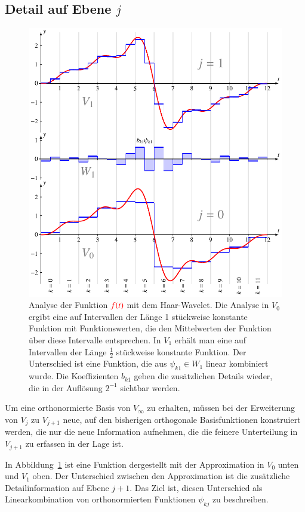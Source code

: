 \subsection{Detail auf Ebene $j$}
\begin{figure}
\centering
\includegraphics{chapters/3-haar/images/detail.pdf}
\caption{Analyse der Funktion $\color{red}f(t)$ mit dem Haar-Wavelet.
Die Analyse in $V_0$ ergibt eine auf Intervallen der Länge 1 stückweise
konstante Funktion mit Funktionswerten, die den Mittelwerten der Funktion
über diese Intervalle entsprechen.
In $V_1$ erhält man eine auf Intervallen der Länge $\frac12$ stückweise
konstante Funktion.
Der Unterschied ist eine Funktion, die aus $\psi_{k1}\in W_1$ linear
kombiniert wurde.
Die Koeffizienten $b_{k1}$ geben die zusätzlichen Details wieder,
die in der Auflösung $2^{-1}$ sichtbar werden.
\label{haar:figure:detail}}
\end{figure}
Um eine orthonormierte Basis von $V_\infty$ zu erhalten, müssen
bei der Erweiterung von $V_j$ zu $V_{j+1}$ neue, auf den bisherigen
orthogonale Basisfunktionen konstruiert werden, die nur die neue
Information aufnehmen, die die feinere Unterteilung in $V_{j+1}$
zu erfassen in der Lage ist.

In Abbildung~\ref{haar:figure:detail} ist eine Funktion dergestellt mit
der Approximation in $V_0$ unten und $V_1$ oben.
Der Unterschied zwischen den Approximation ist die zusätzliche
Detailinformation auf Ebene $j+1$.
Das Ziel ist, diesen Unterschied als Linearkombination von orthonormierten
Funktionen $\psi_{kj}$ zu beschreiben.


